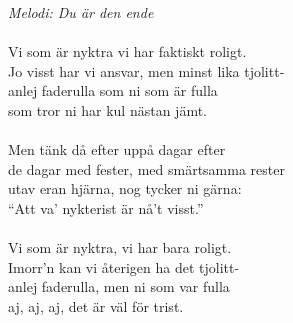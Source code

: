{\footnotesize\textit{Melodi: Du är den ende}}\\
\\
Vi som är nyktra vi har faktiskt roligt.\\
Jo visst har vi ansvar, men minst lika tjolitt-\\
anlej faderulla som ni som är fulla\\
som tror ni har kul nästan jämt.\\
\\
Men tänk då efter uppå dagar efter\\
de dagar med fester, med smärtsamma rester\\
utav eran hjärna, nog tycker ni gärna:\\
``Att va' nykterist är nå't visst.''\\
\\
Vi som är nyktra, vi har bara roligt.\\
Imorr'n kan vi återigen ha det tjolitt-\\
anlej faderulla, men ni som var fulla\\
aj, aj, aj, det är väl för trist.
